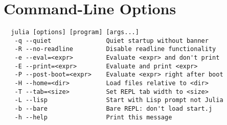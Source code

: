 \documentclass{article}
\renewcommand{\sec}[1]{\label{sec:#1}}
\begin{document}
% 
% 
% 

\section{Command-Line Options}
\sec{command-line-options}

\begin{verbatim}
  julia [options] [program] [args...]
   -q --quiet               Quiet startup without banner
   -R --no-readline         Disable readline functionality
   -e --eval=<expr>         Evaluate <expr> and don't print
   -E --print=<expr>        Evaluate and print <expr>
   -P --post-boot=<expr>    Evaluate <expr> right after boot
   -H --home=<dir>          Load files relative to <dir>
   -T --tab=<size>          Set REPL tab width to <size>
   -L --lisp                Start with Lisp prompt not Julia
   -b --bare                Bare REPL: don't load start.j
   -h --help                Print this message
\end{verbatim}
\end{document}
